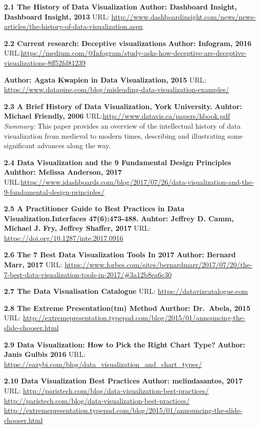\documentclass[]{book}
\theoremstyle{definition}
\theoremstyle{definition}
\theoremstyle{definition}
\theoremstyle{remark}
\begin{document}
\textbf{2.1 The History of Data Visualization} \textbf{Author: Dashboard
Insight, Dashboard Insight, 2013} URL:
\url{http://www.dashboardinsight.com/news/news-articles/the-history-of-data-visualization.aspx}

\textbf{2.2 Current research: Deceptive visualizations} \textbf{Author:
Infogram, 2016}
URL:\url{https://medium.com/@Infogram/study-asks-how-deceptive-are-deceptive-visualizations-8ff52fd81239}

\textbf{Author: Agata Kwapien in Data Visualization, 2015} URL:
\url{https://www.datapine.com/blog/misleading-data-visualization-examples/}

\textbf{2.3 A Brief History of Data Visualization, York University.}
\textbf{Auhtor: Michael Friendly, 2006}
URL:\url{http://www.datavis.ca/papers/hbook.pdf} \emph{Summary: } This
paper provides an overview of the intellectual history of data
visualization from medieval to modern times, describing and illustrating
some significant advances along the way.

\textbf{2.4 Data Visualization and the 9 Fundamental Design Principles}
\textbf{Auhthor: Melissa Anderson, 2017}
URL:\url{https://www.idashboards.com/blog/2017/07/26/data-visualization-and-the-9-fundamental-design-principles/}

\textbf{2.5 A Practitioner Guide to Best Practices in Data
Visualization.Interfaces 47(6):473-488.} \textbf{Auhtor: Jeffrey D.
Camm, Michael J. Fry, Jeffrey Shaffer, 2017 } URL:
\url{https://doi.org/10.1287/inte.2017.0916}

\textbf{2.6 The 7 Best Data Visualization Tools In 2017} \textbf{Author:
Bernard Marr, 2017} URL:
\url{https://www.forbes.com/sites/bernardmarr/2017/07/20/the-7-best-data-visualization-tools-in-2017/\#3a12b8ea6c30}

\textbf{2.7 The Data Visualisation Catalogue} URL:
\url{https://datavizcatalogue.com}

\textbf{2.8 The Extreme Presentation(tm) Method } \textbf{Aurthor:
Dr.~Abela, 2015 } URL:
\url{http://extremepresentation.typepad.com/blog/2015/01/announcing-the-slide-chooser.html}

\textbf{2.9 Data Visualization: How to Pick the Right Chart Type? }
\textbf{Author: Janis Gulbis 2016 } URL:
\url{https://eazybi.com/blog/data_visualization_and_chart_types/}

\textbf{2.10 Data Visualization Best Practices} \textbf{Author:
melindasantos, 2017} URL:
\url{http://paristech.com/blog/data-visualization-best-practices/}
\url{http://paristech.com/blog/data-visualization-best-practices/}
\url{http://extremepresentation.typepad.com/blog/2015/01/announcing-the-slide-chooser.html}
\end{document}
